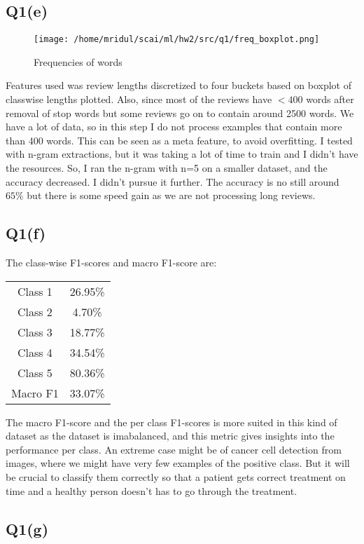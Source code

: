 \documentclass[11pt]{article}
\begin{document}
\subsection{Q1(e)}
\label{sec:org1ce0906}
\begin{figure}[!htp]
\centering
\texttt{[image: /home/mridul/scai/ml/hw2/src/q1/freq\_boxplot.png]}
\caption{Frequencies of words}
\end{figure} Features used was
review lengths discretized to four buckets based on boxplot of
classwise lengths plotted. Also, since most of the reviews have
\(<400\) words after removal of stop words but some reviews go on to
contain around 2500 words. We have a lot of data, so in this step I do
not process examples that contain more than 400 words. This can be
seen as a meta feature, to avoid overfitting. I tested with n-gram
extractions, but it was taking a lot of time to train and I didn't
have the resources. So, I ran the n-gram with n=5 on a smaller
dataset, and the accuracy decreased. I didn't pursue it further. The
accuracy is no still around \(65\%\) but there is some speed gain as
we are not processing long reviews.

\subsection{Q1(f)}
\label{sec:org7318bc7}
The class-wise F1-scores and macro F1-score are:
\par
\begin{center}
\begin{tabular}{cc}
Class 1 & 26.95\%\\
Class 2 & 4.70\%\\
Class 3 & 18.77\%\\
Class 4 & 34.54\%\\
Class 5 & 80.36\%\\
Macro F1 & 33.07\%
\end{tabular}
\end{center}
\par
The macro F1-score and the per class F1-scores is more suited in this
kind of dataset as the dataset is imabalanced, and this metric gives
insights into the performance per class. An extreme case might be of
cancer cell detection from images, where we might have very few
examples of the positive class. But it will be crucial to classify
them correctly so that a patient gets correct treatment on time and a
healthy person doesn't has to go through the treatment.


\subsection{Q1(g)}
\label{sec:orge6ae106}
\end{document}
